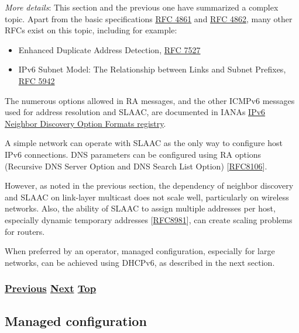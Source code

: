 \documentclass[
]{article}
\begin{document}
\emph{More details}: This section and the previous one have summarized a
complex topic. Apart from the basic specifications
\href{https://www.rfc-editor.org/info/rfc4861}{RFC 4861} and
\href{https://www.rfc-editor.org/info/rfc4862}{RFC 4862}, many other
RFCs exist on this topic, including for example:

\begin{itemize}
\item
  Enhanced Duplicate Address Detection,
  \href{https://www.rfc-editor.org/info/rfc7527}{RFC 7527}
\item
  IPv6 Subnet Model: The Relationship between Links and Subnet Prefixes,
  \href{https://www.rfc-editor.org/info/rfc5942}{RFC 5942}
\end{itemize}

The numerous options allowed in RA messages, and the other ICMPv6
messages used for address resolution and SLAAC, are documented in
IANA\textquotesingle s
\href{https://www.iana.org/assignments/icmpv6-parameters/icmpv6-parameters.xhtml\#icmpv6-parameters-5}{IPv6
Neighbor Discovery Option Formats registry}.

A simple network can operate with SLAAC as the only way to configure
host IPv6 connections. DNS parameters can be configured using RA options
(Recursive DNS Server Option and DNS Search List Option)
{[}\href{https://www.rfc-editor.org/info/rfc8106}{RFC8106}{]}.

However, as noted in the previous section, the dependency of neighbor
discovery and SLAAC on link-layer multicast does not scale well,
particularly on wireless networks. Also, the ability of SLAAC to assign
multiple addresses per host, especially dynamic temporary addresses
{[}\href{https://www.rfc-editor.org/info/rfc8981}{RFC8981}{]}, can
create scaling problems for routers.

When preferred by an operator, managed configuration, especially for
large networks, can be achieved using DHCPv6, as described in the next
section.

\subsubsection{\texorpdfstring{\hyperref[address-resolution]{Previous}
\hyperref[managed-configuration]{Next}
\hyperref[ipv6-basic-technology]{Top}}{Previous Next Top}}\label{previous-next-top-11}

\pagebreak

\subsection{Managed configuration}\label{managed-configuration}
\end{document}
